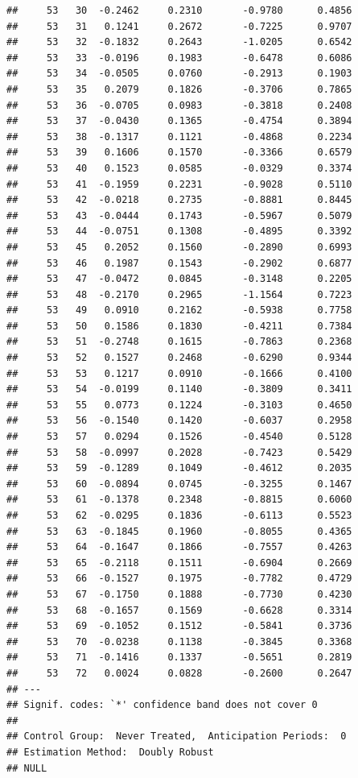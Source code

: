 \documentclass[
]{article}
\begin{document}
\begin{verbatim}
##     53   30  -0.2462     0.2310       -0.9780      0.4856 
##     53   31   0.1241     0.2672       -0.7225      0.9707 
##     53   32  -0.1832     0.2643       -1.0205      0.6542 
##     53   33  -0.0196     0.1983       -0.6478      0.6086 
##     53   34  -0.0505     0.0760       -0.2913      0.1903 
##     53   35   0.2079     0.1826       -0.3706      0.7865 
##     53   36  -0.0705     0.0983       -0.3818      0.2408 
##     53   37  -0.0430     0.1365       -0.4754      0.3894 
##     53   38  -0.1317     0.1121       -0.4868      0.2234 
##     53   39   0.1606     0.1570       -0.3366      0.6579 
##     53   40   0.1523     0.0585       -0.0329      0.3374 
##     53   41  -0.1959     0.2231       -0.9028      0.5110 
##     53   42  -0.0218     0.2735       -0.8881      0.8445 
##     53   43  -0.0444     0.1743       -0.5967      0.5079 
##     53   44  -0.0751     0.1308       -0.4895      0.3392 
##     53   45   0.2052     0.1560       -0.2890      0.6993 
##     53   46   0.1987     0.1543       -0.2902      0.6877 
##     53   47  -0.0472     0.0845       -0.3148      0.2205 
##     53   48  -0.2170     0.2965       -1.1564      0.7223 
##     53   49   0.0910     0.2162       -0.5938      0.7758 
##     53   50   0.1586     0.1830       -0.4211      0.7384 
##     53   51  -0.2748     0.1615       -0.7863      0.2368 
##     53   52   0.1527     0.2468       -0.6290      0.9344 
##     53   53   0.1217     0.0910       -0.1666      0.4100 
##     53   54  -0.0199     0.1140       -0.3809      0.3411 
##     53   55   0.0773     0.1224       -0.3103      0.4650 
##     53   56  -0.1540     0.1420       -0.6037      0.2958 
##     53   57   0.0294     0.1526       -0.4540      0.5128 
##     53   58  -0.0997     0.2028       -0.7423      0.5429 
##     53   59  -0.1289     0.1049       -0.4612      0.2035 
##     53   60  -0.0894     0.0745       -0.3255      0.1467 
##     53   61  -0.1378     0.2348       -0.8815      0.6060 
##     53   62  -0.0295     0.1836       -0.6113      0.5523 
##     53   63  -0.1845     0.1960       -0.8055      0.4365 
##     53   64  -0.1647     0.1866       -0.7557      0.4263 
##     53   65  -0.2118     0.1511       -0.6904      0.2669 
##     53   66  -0.1527     0.1975       -0.7782      0.4729 
##     53   67  -0.1750     0.1888       -0.7730      0.4230 
##     53   68  -0.1657     0.1569       -0.6628      0.3314 
##     53   69  -0.1052     0.1512       -0.5841      0.3736 
##     53   70  -0.0238     0.1138       -0.3845      0.3368 
##     53   71  -0.1416     0.1337       -0.5651      0.2819 
##     53   72   0.0024     0.0828       -0.2600      0.2647 
## ---
## Signif. codes: `*' confidence band does not cover 0
## 
## Control Group:  Never Treated,  Anticipation Periods:  0
## Estimation Method:  Doubly Robust
## NULL
\end{verbatim}
\end{document}
